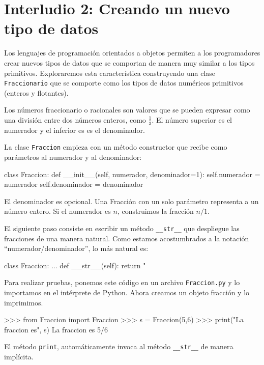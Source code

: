 
\chapter{Interludio 2: Creando un nuevo tipo de datos }

\label{overloading} 

Los lenguajes de programación orientados a objetos permiten a los
programadores crear nuevos tipos de datos que se comportan de manera
muy similar a los tipos primitivos. Exploraremos esta característica
construyendo una clase \texttt{Fraccionario} que se comporte como
los tipos de datos numéricos primitivos (enteros y flotantes).

Los números fraccionario o racionales son valores que se pueden expresar
como una división entre dos números enteros, como $\frac{1}{3}$.
El número superior es el numerador y el inferior es es el denominador.

   

La clase \texttt{Fraccion} empieza con un método constructor que recibe
como parámetros al numerador y al denominador:

\begin{pythoncode}
class Fraccion:
  def __init__(self, numerador, denominador=1):
    self.numerador = numerador
    self.denominador = denominador
\end{pythoncode}
El denominador es opcional. Una Fracción con un solo parámetro representa
a un número entero. Si el numerador es $n$, construimos la fracción
$n/1$.

El siguiente paso consiste en escribir un método \texttt{\_\_str\_\_}
que despliegue las fracciones de una manera natural. Como estamos
acostumbrados a la notación ``numerador/denominador'', lo más natural
es:

\begin{pythoncode}
class Fraccion:
  ...
  def __str__(self):
    return "%
\end{pythoncode}
 Para realizar pruebas, ponemos este código en un archivo \texttt{Fraccion.py}
y lo importamos en el intérprete de Python. Ahora creamos un objeto
fracción y lo imprimimos.

\begin{pyconcode}
>>> from Fraccion import Fraccion
>>> s = Fraccion(5,6)
>>> print("La fraccion es", s)
La fraccion es 5/6
\end{pyconcode}
 El método \texttt{print}, automáticamente invoca al método \texttt{\_\_str\_\_}
de manera implícita.

